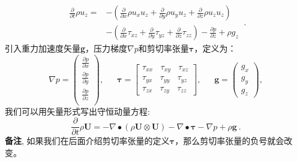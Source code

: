 \documentclass[LBMDerivation.tex]{subfiles}
\begin{document}
\begin{equation}
\boxed{
\begin{aligned}
  \frac{\partial}{\partial t} \rho u_z
=
 &-\left(
      \frac{\partial}{\partial x} \rho u_x u_z
      +\frac{\partial}{\partial y} \rho u_y u_z
      +\frac{\partial}{\partial z} \rho u_z u_z
  \right)\\
 &-\left(
      \frac{\partial}{\partial x}  \tau_{xz}
      +\frac{\partial}{\partial y}  \tau_{yz}
      +\frac{\partial}{\partial z}  \tau_{zz}
  \right)
  -
  \frac{\partial p}{\partial z}
  +
  \rho g_z
  \label{EQUATION::momentumZ}
\end{aligned}
}~.
\end{equation}
%
%
	引入重力加速度矢量\textbf{g}，压力梯度$\nabla p$和剪切率张量$\boldsymbol \tau$，定义为：
%
%
\begin{equation*}
    \nabla p
=
\left(
  \begin{matrix}
    \frac{\partial p}{\partial x} \\
    \frac{\partial p}{\partial y} \\
    \frac{\partial p}{\partial z} \\
  \end{matrix}
  \right),
  ~ ~ ~ ~ ~ ~ ~
\boldsymbol \tau
=
\left[
 \begin{matrix}
  \tau_{xx} ~~~~ \tau_{xy} ~~~~ \tau_{xz} \\
  \tau_{yx} ~~~~ \tau_{yy} ~~~~ \tau_{yz} \\
  \tau_{zx} ~~~~ \tau_{zy} ~~~~ \tau_{zz}
 \end{matrix}
\right],
  ~ ~ ~ ~ ~ ~ ~
\textbf{g}
=
\left(
 \begin{matrix}
  g_x \\
  g_y \\
  g_z
 \end{matrix}
\right),
\end{equation*}
%
%
	我们可以用矢量形式写出守恒动量方程:
%
%
\begin{equation}
 \boxed{
    \frac{\partial}{\partial t} \rho \textbf{U}
=
    -   \nabla \bullet \left(\rho\textbf{U} \otimes \textbf{U}\right)
    -   \nabla \bullet \boldsymbol \tau
    -   \nabla p
    + \rho\textbf{g}
 }~.
 \label{EQUATION::momentumDiv}
\end{equation}
%
%
    \textbf{备注},   如果我们在后面介绍剪切率张量的定义$\boldsymbol \tau$，那么剪切率张量的负号就会改变。
%
%
%
%
%
\end{document}
